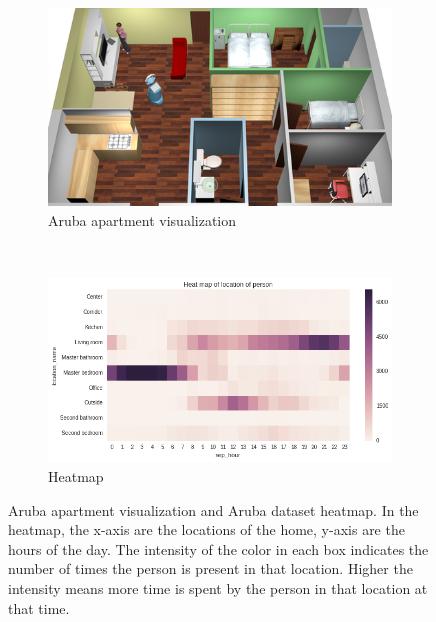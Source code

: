 \begin{figure}
    \centering
    \begin{subfigure}[b]{0.4\textwidth}

        \includegraphics[width=\textwidth]{images/aruba-flat.png}
        \caption{Aruba apartment visualization}
        \label{aruba}
    \end{subfigure}
    ~ %
    \begin{subfigure}[b]{0.5\textwidth}
        \includegraphics[width=\textwidth]{images/aruba-data.png}
        \caption{Heatmap}
        \label{fig:eval_gt}
    \end{subfigure}

    \caption[Aruba apartment visualization]{Aruba apartment visualization and Aruba dataset heatmap. In the heatmap, the x-axis are the locations of the home, y-axis are the hours of the day. The intensity of the color in each box indicates the number of times the person is present in that location. Higher the intensity means more time is spent by the person in that location at that time.}
    \label{aruba-visual}
\end{figure}

